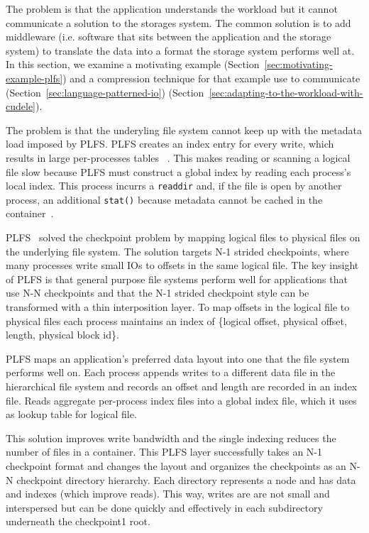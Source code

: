 The problem is that the application understands the workload but it cannot
communicate a solution to the storages system. The common solution is to add
middleware (i.e. software that sits between the application and the storage
system) to translate the data into a format the storage system performs well
at. In this section, we examine a motivating example
(Section~\ref{sec:motivating-example-plfs}) and a compression technique for that example
use to communicate (Section~\ref{sec:language-patterned-io})
(Section~\ref{sec:adapting-to-the-workload-with-cudele}).  

The problem is that the underyling file system cannot keep up with the metadata
load imposed by PLFS. PLFS creates an index entry for every write, which
results in large per-processes tables ~\cite{grider:pc17-diddlings}. This makes
reading or scanning a logical file slow because PLFS must construct a global
index by reading each process's local index. This process incurrs a
\texttt{readdir} and, if the file is open by another process, an additional
\texttt{stat()} because metadata cannot be cached in the
container~\cite{bent_plfs_2009}.

PLFS~\cite{bent_plfs_2009} solved the checkpoint problem by mapping logical
files to physical files on the underlying file system. The solution targets N-1
strided checkpoints, where many processes write small IOs to offsets in the
same logical file. The key insight of PLFS is that general purpose file systems
perform well for applications that use N-N checkpoints and that the N-1 strided
checkpoint style can be transformed with a thin interposition layer. To map
offsets in the logical file to physical files each process maintains an index
of \{logical offset, physical offset, length, physical block id\}. 

PLFS maps an application's preferred data layout into one that the file system
performs well on. Each process appends writes to a different data file in the
hierarchical file system and records an offset and length are recorded in an
index file. Reads aggregate per-process index files into a global index file,
which it uses as lookup table for logical file. 

This solution improves write bandwidth and the single indexing reduces the
number of files in a container. This PLFS layer successfully takes an N-1
checkpoint format and changes the layout and organizes the checkpoints as an
N-N checkpoint directory hierarchy. Each directory represents a node and has
data and indexes (which improve reads). This way, writes are are not small and
interspersed but can be done quickly and effectively in each subdirectory
underneath the checkpoint1 root.


